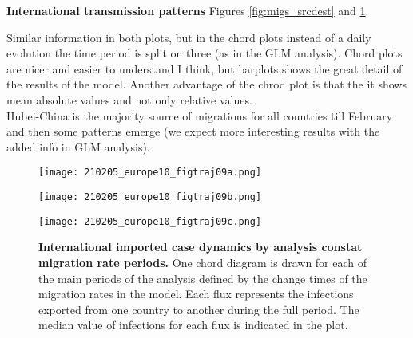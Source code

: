 \textbf{International transmission patterns}
Figures \ref{fig:migs_srcdest} and \ref{fig:migs}.\\

Similar information in both plots, but in the chord plots instead of a daily evolution the time period is split on three (as in the GLM analysis). Chord plots are nicer and easier to understand I think, but barplots shows the great detail of the results of the model. Another advantage of the chrod plot is that the it shows mean absolute values and not only relative values.\\

Hubei-China is the majority source of migrations for all countries till February and then some patterns emerge (we expect more interesting results with the added info in GLM analysis).\\


\begin{figure}[!tbp]
  \centering

  \begin{minipage}[t]{0.4\textwidth}
  \texttt{[image: 210205\_europe10\_figtraj09a.png]}
  \label{fig:migs1}
  \end{minipage}
  \begin{minipage}[t]{0.4\textwidth}
  \texttt{[image: 210205\_europe10\_figtraj09b.png]}
  \label{fig:migs2}
  \end{minipage}
  \begin{minipage}[t]{0.4\textwidth}
  \texttt{[image: 210205\_europe10\_figtraj09c.png]}
  \label{fig:migs3}
  \end{minipage}
  \caption{\textbf{International imported case dynamics by analysis constat migration rate periods.} One chord diagram is drawn for each of the main periods of the analysis defined by the change times of the migration rates in the model. Each flux represents the infections exported from one country to another during the full period. The median value of infections for each flux is indicated in the plot.}
  \label{fig:migs}
\end{figure}



